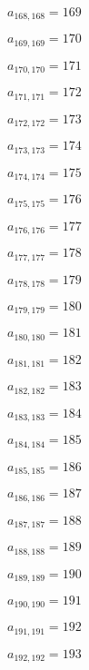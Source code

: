 \documentclass[a4paper,12pt]{article}
\begin{document}
$a _{ 168, 168 } = 169$

$a _{ 169, 169 } = 170$

$a _{ 170, 170 } = 171$

$a _{ 171, 171 } = 172$

$a _{ 172, 172 } = 173$

$a _{ 173, 173 } = 174$

$a _{ 174, 174 } = 175$

$a _{ 175, 175 } = 176$

$a _{ 176, 176 } = 177$

$a _{ 177, 177 } = 178$

$a _{ 178, 178 } = 179$

$a _{ 179, 179 } = 180$

$a _{ 180, 180 } = 181$

$a _{ 181, 181 } = 182$

$a _{ 182, 182 } = 183$

$a _{ 183, 183 } = 184$

$a _{ 184, 184 } = 185$

$a _{ 185, 185 } = 186$

$a _{ 186, 186 } = 187$

$a _{ 187, 187 } = 188$

$a _{ 188, 188 } = 189$

$a _{ 189, 189 } = 190$

$a _{ 190, 190 } = 191$

$a _{ 191, 191 } = 192$

$a _{ 192, 192 } = 193$
\end{document}
